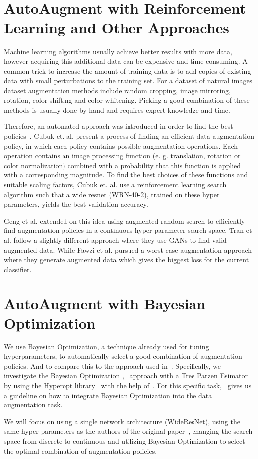 \documentclass[10pt,twocolumn,letterpaper]{article}
\begin{document}
\section{AutoAugment with Reinforcement Learning and Other Approaches}
Machine learning algorithms usually achieve better results with more data, however acquiring this additional data can be expensive and time-consuming.  A common trick to increase the amount of training data is to add copies of existing data with small perturbations to the training set. For a dataset of natural images dataset augmentation methods include random cropping, image mirroring, rotation, color shifting and color whitening. Picking a good combination of these methods is usually done by hand and requires expert knowledge and time.
\par
Therefore, an automated approach was introduced in order to find the best policies~\cite{Ekin}. Cubuk et. al. present a process of finding an efficient data augmentation policy, in which each policy contains possible augmentation operations. Each operation contains an image processing function (e. g. translation, rotation or color normalization) combined with a probability that this function is applied with a corresponding magnitude. To find the best choices of these functions and suitable scaling factors, Cubuk et. al. use a reinforcement learning search algorithm such that a wide resnet (WRN-40-2), trained on these hyper parameters, yields the best validation accuracy. 
\par
Geng et al. \cite{DBLP:journals/corr/abs-1811-04768} extended on this idea using augmented random search to efficiently find augmentation policies in a continuous hyper parameter search space. Tran et al. \cite{DBLP:journals/corr/abs-1710-10564} follow a slightly different approach where they use GANs to find valid augmented data. While Fawzi et al. \cite{Fawzi} pursued a worst-case augmentation approach where they generate augmented data which gives the biggest loss for the current classifier.

\section{AutoAugment with Bayesian Optimization}
We use Bayesian Optimization, a technique already used for tuning hyperparameters, to automatically select a good combination of augmentation policies. And to compare this to the approach used in~\cite{Ekin}. Specifically, we investigate the Bayesian Optimization \cite{2018arXiv180702811F},~\cite{Goodfellow-et-al-2016} approach with a Tree Parzen Esimator~\cite{Kaggle_AMT} by using the Hyperopt library~\cite{HyperOpt} with the help of~\cite{BO_Hyperopt}. For this specific task,~\cite{2017arXiv171010564T} gives us a guideline on how to integrate Bayesian Optimization into the data augmentation task.
\par
We will focus on using a single network architecture (WideResNet), using the same hyper parameters as the authors of the original paper~\cite{Ekin}, changing the search space from discrete to continuous and utilizing Bayesian Optimization to select the optimal combination of augmentation policies. 
\end{document}
